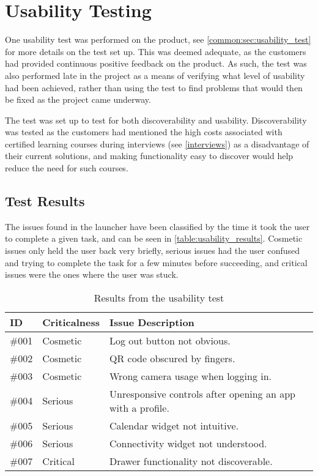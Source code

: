 \chapter{Usability Testing}
\label{sec:usability_test}

One usability test was performed on the product, see \autoref{common:sec:usability_test} for more details on the test set up. 
This was deemed adequate, as the customers had provided continuous positive feedback on the product. 
As such, the test was also performed late in the project as a means of verifying what level of usability had been achieved, rather than using the test to find problems that would then be fixed as the project came underway. 

The test was set up to test for both discoverability and usability. 
Discoverability was tested as the customers had mentioned the high costs associated with certified learning courses during interviews (see \autoref{interviews}) as a disadvantage of their current solutions, and making functionality easy to discover would help reduce the need for such courses.

\section{Test Results}
The issues found in the launcher have been classified by the time it took the user to complete a given task, and can be seen in \autoref{table:usability_results}. 
Cosmetic issues only held the user back very briefly, serious issues had the user confused and trying to complete the task for a few minutes before succeeding, and critical issues were the ones where the user was stuck. 

\begin{table}[ht]
\centering  %
\begin{tabular}{| l | l | p{3in} |}
\hline
\textbf{ID} & \textbf{Criticalness} & \textbf{Issue Description} \\ [0.5ex] %
\hline                  %
\#{}001 & Cosmetic & Log out button not obvious. \\ \hline 
\#{}002 & Cosmetic & QR code obscured by fingers. \\ \hline 
\#{}003 & Cosmetic & Wrong camera usage when logging in. \\ \hline
\#{}004 & Serious & Unresponsive controls after opening an app with a profile. \\ \hline
\#{}005 & Serious & Calendar widget not intuitive. \\ \hline
\#{}006 & Serious & Connectivity widget not understood. \\ \hline
\#{}007 & Critical & Drawer functionality not discoverable. \\ [1ex]      %
\hline %
\end{tabular}
\caption{Results from the usability test} %
\label{table:usability_results} %
\end{table}


